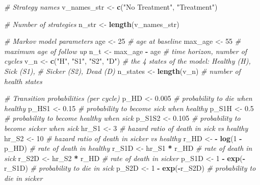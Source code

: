 \documentclass[
]{article}
\newenvironment{Shaded}{\begin{snugshade}}{\end{snugshade}}
\newcommand{\CommentTok}[1]{\textcolor[rgb]{0.56,0.35,0.01}{\textit{#1}}}
\newcommand{\DecValTok}[1]{\textcolor[rgb]{0.00,0.00,0.81}{#1}}
\newcommand{\FloatTok}[1]{\textcolor[rgb]{0.00,0.00,0.81}{#1}}
\newcommand{\KeywordTok}[1]{\textcolor[rgb]{0.13,0.29,0.53}{\textbf{#1}}}
\newcommand{\NormalTok}[1]{#1}
\newcommand{\OperatorTok}[1]{\textcolor[rgb]{0.81,0.36,0.00}{\textbf{#1}}}
\newcommand{\StringTok}[1]{\textcolor[rgb]{0.31,0.60,0.02}{#1}}
\begin{document}
\begin{Shaded}
\begin{Highlighting}[]
\CommentTok{# Strategy names}
\NormalTok{v_names_str <-}\StringTok{ }\KeywordTok{c}\NormalTok{(}\StringTok{"No Treatment"}\NormalTok{, }\StringTok{"Treatment"}\NormalTok{) }

\CommentTok{# Number of strategies}
\NormalTok{n_str <-}\StringTok{ }\KeywordTok{length}\NormalTok{(v_names_str)}

\CommentTok{# Markov model parameters}
\NormalTok{age     <-}\StringTok{ }\DecValTok{25}                       \CommentTok{# age at baseline}
\NormalTok{max_age <-}\StringTok{ }\DecValTok{55}                       \CommentTok{# maximum age of follow up}
\NormalTok{n_t     <-}\StringTok{ }\NormalTok{max_age }\OperatorTok{-}\StringTok{ }\NormalTok{age            }\CommentTok{# time horizon, number of cycles}
\NormalTok{v_n     <-}\StringTok{ }\KeywordTok{c}\NormalTok{(}\StringTok{"H"}\NormalTok{, }\StringTok{"S1"}\NormalTok{, }\StringTok{"S2"}\NormalTok{, }\StringTok{"D"}\NormalTok{)  }\CommentTok{# the 4 states of the model: Healthy (H), Sick (S1), }
                                    \CommentTok{# Sicker (S2), Dead (D)}
\NormalTok{n_states     <-}\StringTok{ }\KeywordTok{length}\NormalTok{(v_n)         }\CommentTok{# number of health states }

\CommentTok{# Transition probabilities (per cycle)}
\NormalTok{p_HD    <-}\StringTok{ }\FloatTok{0.005}                    \CommentTok{# probability to die when healthy}
\NormalTok{p_HS1   <-}\StringTok{ }\FloatTok{0.15}                       \CommentTok{# probability to become sick when healthy}
\NormalTok{p_S1H   <-}\StringTok{ }\FloatTok{0.5}                        \CommentTok{# probability to become healthy when sick}
\NormalTok{p_S1S2  <-}\StringTok{ }\FloatTok{0.105}                      \CommentTok{# probability to become sicker when sick}
\NormalTok{hr_S1   <-}\StringTok{ }\DecValTok{3}                          \CommentTok{# hazard ratio of death in sick vs healthy}
\NormalTok{hr_S2   <-}\StringTok{ }\DecValTok{10}                         \CommentTok{# hazard ratio of death in sicker vs healthy }
\NormalTok{r_HD    <-}\StringTok{ }\OperatorTok{-}\StringTok{ }\KeywordTok{log}\NormalTok{(}\DecValTok{1} \OperatorTok{-}\StringTok{ }\NormalTok{p_HD)          }\CommentTok{# rate of death in healthy}
\NormalTok{r_S1D   <-}\StringTok{ }\NormalTok{hr_S1 }\OperatorTok{*}\StringTok{ }\NormalTok{r_HD               }\CommentTok{# rate of death in sick}
\NormalTok{r_S2D   <-}\StringTok{ }\NormalTok{hr_S2 }\OperatorTok{*}\StringTok{ }\NormalTok{r_HD               }\CommentTok{# rate of death in sicker}
\NormalTok{p_S1D   <-}\StringTok{ }\DecValTok{1} \OperatorTok{-}\StringTok{ }\KeywordTok{exp}\NormalTok{(}\OperatorTok{-}\NormalTok{r_S1D)          }\CommentTok{# probability to die in sick}
\NormalTok{p_S2D   <-}\StringTok{ }\DecValTok{1} \OperatorTok{-}\StringTok{ }\KeywordTok{exp}\NormalTok{(}\OperatorTok{-}\NormalTok{r_S2D)          }\CommentTok{# probability to die in sicker}


\end{Highlighting}
\end{Shaded}
\end{document}
